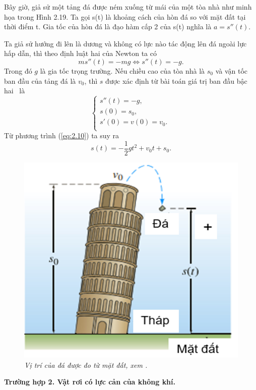 Bây giờ, giả sử một tảng đá được ném xuống từ mái của một tòa nhà như minh họa trong Hình 2.19. Ta gọi s(t) là khoảng cách của hòn đá so với mặt đất tại thời điểm t. Gia tốc của hòn đá là đạo hàm cấp 2 của s(t) nghĩa là $a={s}''(t)$. 

Ta giả sử  hướng đi lên là dương và không có lực nào tác động lên đá ngoài lực hấp dẫn, thì theo định luật hai của Newton ta có  
\begin{equation}
	m{s}''(t)=-mg\Leftrightarrow {s}''(t)=-g.
\label{eq:2.10}
\end{equation}
Trong đó $g$ là gia tốc trọng trường. Nếu chiều cao của tòa nhà là $s_0$ và vận tốc ban đầu của tảng đá là ${{v}_{0}}$, thì $s$ được xác định từ bài toán giá trị ban đầu bậc hai~ là
\begin{equation}
	\left\{ \begin{array}{l}
	 {s}''(t)=-g, \\ 
	 s(0)={{s}_{0}}, \\ 
	 s'(0)=v(0)={{v}_{0}}. \\ 
\end{array} \right.\,
\label{eq:2.11}
\end{equation}
Từ phương trình (\ref{eq:2.10}) ta suy ra  
\begin{equation}
	s(t)=-\dfrac{1}{2}g{{t}^{2}}+{{v}_{0}}t+{{s}_{0}}.
\label{eq:2.12}
\end{equation}
\begin{figure}[H]
	\centering
	\includegraphics[scale=0.5]{Images/hinh_2_19.png}
	\caption[Vị trí của đá được đo từ mặt đất, xem \cite{ref4}.
	]{\itshape\fontsize{13pt}{0pt}\selectfont\centering Vị trí của đá được đo từ mặt đất, xem \cite{ref4}.}
	\label{hinh2.19}
\end{figure}                                       
\noindent\textbf{Trường hợp 2. Vật rơi có lực cản của không khí.}

